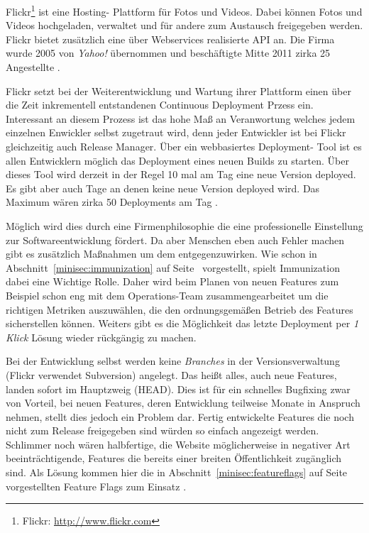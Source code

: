 Flickr\footnote{Flickr: \url{http://www.flickr.com}} ist eine Hosting-
Plattform für Fotos und Videos. Dabei können Fotos und Videos hochgeladen,
verwaltet und für andere zum Austausch freigegeben werden. Flickr bietet
zusätzlich eine über Webservices realisierte API an. Die Firma wurde 2005 von
\emph{Yahoo!} übernommen und beschäftigte Mitte 2011 zirka 25 Angestellte
\cite{flickr11}.

Flickr setzt bei der Weiterentwicklung und Wartung ihrer Plattform einen über
die Zeit inkrementell entstandenen Continuous Deployment Przess ein.
Interessant an diesem Prozess ist das hohe Maß an Veranwortung welches jedem
einzelnen Enwickler selbst zugetraut wird, denn jeder Entwickler ist bei
Flickr gleichzeitig auch Release Manager. Über ein webbasiertes Deployment-
Tool ist es allen Entwicklern möglich das Deployment eines neuen Builds zu
starten. Über dieses Tool wird derzeit in der Regel 10 mal am Tag eine neue
Version deployed. Es gibt aber auch Tage an denen keine neue Version deployed
wird. Das Maximum wären zirka 50 Deployments am Tag \cite{flickr11}.

Möglich wird dies durch eine Firmenphilosophie die eine professionelle
Einstellung \cite{flickr11} zur Softwareentwicklung fördert. Da aber Menschen
eben auch Fehler machen gibt es zusätzlich Maßnahmen um dem entgegenzuwirken.
Wie schon in Abschnitt~\ref{minisec:immunization} auf
Seite~\pageref{minisec:immunization} vorgestellt, spielt Immunization dabei
eine Wichtige Rolle. Daher wird beim Planen von neuen Features zum Beispiel
schon eng mit dem Operations-Team zusammengearbeitet um die richtigen Metriken
auszuwählen, die den ordnungsgemäßen Betrieb des Features sicherstellen
können. Weiters gibt es die Möglichkeit das letzte Deployment per \emph{1
Klick} Lösung wieder rückgängig zu machen. 

 Bei der Entwicklung selbst werden keine \emph{Branches} in
der Versionsverwaltung (Flickr verwendet Subversion) angelegt. Das heißt
alles, auch neue Features, landen sofort im Hauptzweig (HEAD). Dies ist für
ein schnelles Bugfixing zwar von Vorteil, bei neuen Features, deren
Entwicklung teilweise Monate in Anspruch nehmen, stellt dies jedoch ein
Problem dar. Fertig entwickelte Features die noch nicht zum Release
freigegeben sind würden so einfach angezeigt werden. Schlimmer noch wären
halbfertige, die Website möglicherweise in negativer Art beeinträchtigende,
Features die bereits einer breiten Öffentlichkeit zugänglich sind. Als Lösung
kommen hier die in Abschnitt~\ref{minisec:featureflags} auf
Seite~\pageref{minisec:featureflags} vorgestellten Feature Flags zum Einsatz
\cite{flickr09}.

